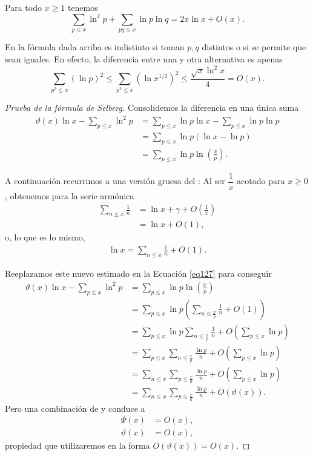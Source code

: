 \begin{theorem}\label{the22}
Para todo $x \geq 1$ tenemos
\[
\sum_{p \leq x} \ln^2 p + \sum_{pq \leq x} \ln p \ln q = 2x\ln x + O(x).
\]
\end{theorem}

\begin{note}
En la f\'ormula dada arriba es indistinto si toman $p,q$ distintos o si se permite que sean iguales. 
En efecto, la diferencia entre una y otra alternativa es apenas  
\[
\sum_{p^2 \le x} (\ln p)^2 \le \sum_{p^2 \le x} (\ln x^{1/2})^2 \le \frac{\sqrt{x} \ln^2 x}{4}= O(x).  
\]
\end{note}

\begin{proof}[Prueba de la f\'ormula de Selberg]
Consolidemos la diferencia en una \'unica suma 
\begin{align}
\vartheta(x)\ln x - \sum_{p \leq x} \ln^2 p &= \sum_{p \leq x} \ln p \ln x - \sum_{p \leq x} \ln p \ln p \\
&= \sum_{p \leq x} \ln p (\ln x - \ln p) \\
&= \sum_{p \leq x} \ln p \ln \left(\frac{x}{p}\right).\label{eq127}
\end{align}

A continuaci\'on recurrimos a una versi\'on gruesa del :
Al ser $\dfrac{1}{x}$ acotado para $x \ge 0$, obtenemos  para la serie arm\'onica 
\begin{align}
\sum_{n \leq x} \frac{1}{n} &= \ln x + \gamma + O\left(\frac{1}{x}\right) \\
&= \ln x + O(1),  
\end{align}
o, lo que es lo mismo, 
\begin{align}
\ln x = \sum_{n \leq x} \frac{1}{n} + O(1). 
\end{align}

Reeplazamos este nuevo estimado en la Ecuaci\'on \ref{eq127} para conseguir 
\begin{align}
\vartheta(x)\ln x - \sum_{p \leq x} \ln^2 p &= \sum_{p \leq x} \ln p \ln \left(\frac{x}{p}\right) \\
&= \sum_{p \leq x} \ln p \left(\sum_{n \leq \frac{x}{p}} \frac{1}{n} + O(1)\right) \\
&= \sum_{p \leq x} \ln p \sum_{n \leq \frac{x}{p}} \frac{1}{n} + O\left(\sum_{p \leq x} \ln p\right) \\
&= \sum_{p \leq x} \sum_{n \leq \frac{x}{p}} \frac{\ln p}{n} + O\left(\sum_{p \leq x} \ln p\right) \\
&= \sum_{n \leq x} \sum_{p \leq \frac{x}{n}} \frac{\ln p}{n} + O\left(\sum_{p \leq x} \ln p\right) \\
&= \sum_{n \leq x} \sum_{p \leq \frac{x}{n}} \frac{\ln p}{n} + O(\vartheta(x)).\label{eq136}
\end{align}
Pero una combinaci\'on de  y  conduce a 
\begin{align}
\Psi(x) &= O(x),  \\
\vartheta(x) &= O(x),
\end{align}
propiedad que utilizaremos en la forma $O(\vartheta(x))=O(x)$.


\end{proof}
